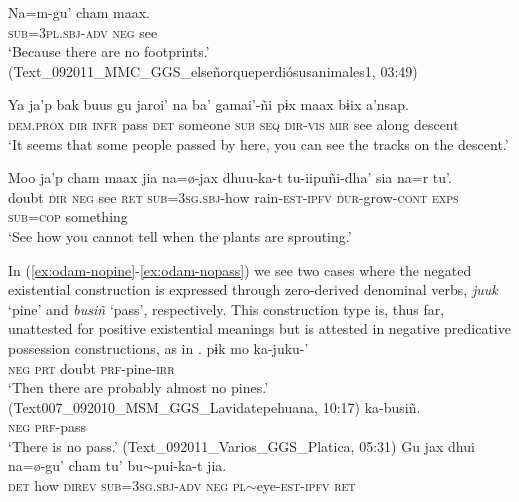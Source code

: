 \documentclass[output=paper,draft,draftmode,colorlinks,citecolor=brown]{langscibook}
\begin{document}
\ea
\label{ex:odam-footprints}
\gll Na=m-gu' 			cham 	maax.\\
\textsc{sub=3pl.sbj-adv}	\textsc{neg} 	see\\
\glt ‘Because there are no footprints.’ (Text\_092011\_MMC\_GGS\_elseñorqueperdiósusanimales1, 03:49)
\z 
\ea
\label{ex:odam-aandb}
\begin{xlist}
\item\label{ex:odam-possee}\gll Ya	ja’p	bak	buus	gu	jaroi’		na	ba’	gamai’-ñi pɨx	maax	bɨix	a’nsap.\\
	\textsc{dem.prox}	\textsc{dir}	\textsc{infr}	pass	\textsc{det}	someone	\textsc{sub}	\textsc{seq}	\textsc{dir-vis} \textsc{mir}	see	along	descent\\
\glt ‘It seems that some people passed by here, you can see the tracks on the descent.’ \citep[120]{willettw2015}
\item\label{ex:odam-negsee}\gll Moo 	ja’p 	cham 	maax	jia 	na=\o-jax 	dhuu-ka-t 	tu-iipuñi-dha’		sia 	na=r tu’.\\
doubt	\textsc{dir}	\textsc{neg}	see	\textsc{ret}	\textsc{sub=3sg.sbj}-how	rain-\textsc{est-ipfv}	\textsc{dur}-grow-\textsc{cont}	\textsc{exps}	\textsc{sub=cop} something\\
\glt ‘See how you cannot tell when the plants are sprouting.’ \citep[120]{willettw2015}

\end{xlist}
\z 
In (\ref{ex:odam-nopine}-\ref{ex:odam-nopass}) we see two cases where the negated existential construction is expressed through zero-derived denominal verbs, \emph{juuk} ‘pine’ and \emph{busiñ} ‘pass’, respectively. This construction type is, thus far, unattested for positive existential meanings but is attested in negative predicative possession constructions, as in . 
\ea
\label{ex:odam-nopine}
 	pɨk 	mo 	ka-juku-'\\
\textsc{neg}		\textsc{prt}	doubt	\textsc{prf}-pine-\textsc{irr}\\
\glt ‘Then there are probably almost no pines.’ (Text007\_092010\_MSM\_GGS\_Lavidatepehuana, 10:17)
\z 
\ea
\label{ex:odam-nopass}
 	ka-busiñ.\\
\textsc{neg}		\textsc{prf}-pass\\
\glt ‘There is no pass.’ (Text\_092011\_Varios\_GGS\_Platica, 05:31)
\z 
\ea
\label{ex:odam-noeyes}
\gll Gu 	jax	dhui 		na=\o-gu’ 			{cham tu'} bu$\sim$pui-ka-t 				jia.\\
\textsc{det} 	how 	\textsc{direv} 	\textsc{sub=3sg.sbj-adv} 	\textsc{neg} \textsc{pl}$\sim$eye-\textsc{est-ipfv} 	\textsc{ret}\\
\end{document}
